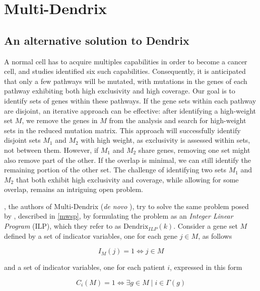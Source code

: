 \section{Multi-Dendrix}

\subsection{An alternative solution to Dendrix}

A normal cell has to acquire multiples capabilities in order to become a cancer cell, and studies identified six such capabilities. Consequently, it is anticipated that only a few pathways will be mutated, with mutations in the genes of each pathway exhibiting both high exclusivity and high coverage. Our goal is to identify sets of genes within these pathways. If the gene sets within each pathway are disjoint, an iterative approach can be effective: after identifying a high-weight set \(M\), we remove the genes in \(M\) from the analysis and search for high-weight sets in the reduced mutation matrix. This approach will successfully identify disjoint sets \(M_1\) and \(M_2\) with high weight, as exclusivity is assessed within sets, not between them. However, if \(M_1\) and \(M_2\) share genes, removing one set might also remove part of the other. If the overlap is minimal, we can still identify the remaining portion of the other set. The challenge of identifying two sets \(M_1\) and \(M_2\) that both exhibit high exclusivity and coverage, while allowing for some overlap, remains an intriguing open problem. 

\textcite{multi-dendrix}, the authors of Multi-Dendrix (\textit{de novo} \cite{survey}), try to solve the same problem posed by \textcite{dendrix}, described in \cref{mwsp}, by formulating the problem as an \textit{Integer Linear Program} (ILP), which they refer to as $\mathrm{Dendrix}_{\mathrm{\textit{ILP}}}(k)$. Consider a gene set $M$ defined by a set of indicator variables, one for each gene $j \in M$, as follows

\begin{equation}
    I_M(j) = 1 \iff j \in M
\end{equation}

and a set of indicator variables, one for each patient $i$, expressed in this form

\begin{equation} \label{c_idefn}
    C_i(M) = 1 \iff \exists g \in M \mid i \in \Gamma(g)
\end{equation}


